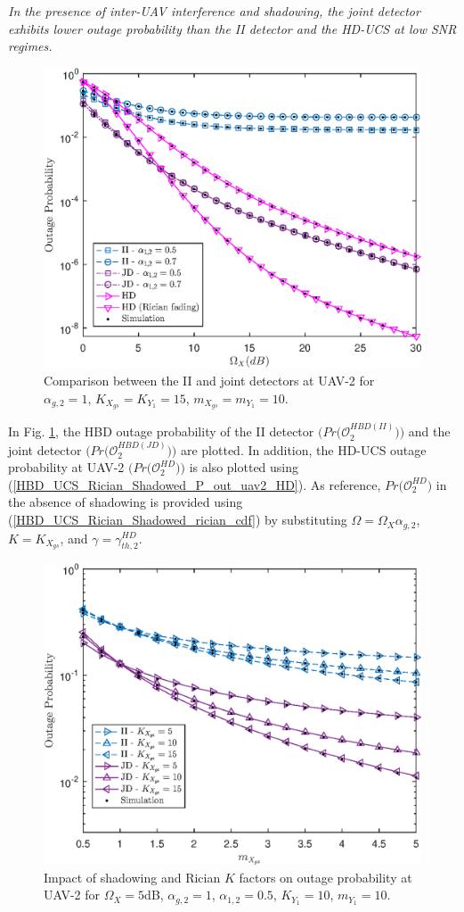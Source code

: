 \begin{observation}
\emph{\emph{In the presence of inter-UAV interference and shadowing, the joint detector exhibits lower outage probability than the II detector and the HD-UCS at low SNR regimes.}
}\end{observation}

\begin{figure} [t]
\centering
\vspace{0.2cm}
\includegraphics [width=0.45\columnwidth]{chap5_fig/uav2_II_vs_JD_outage.eps} 
\caption{Comparison between the II and joint detectors at UAV-2 for $\alpha_{g,2}=1$, $K_{X_{gs}}=K_{Y_1}=15$, $m_{X_{gs}}=m_{Y_1}=10$.}
\label{fig:HBD_UCS_Rician_Shadowed_uav2_II_vs_JD_outage}
\end{figure}

In Fig. \ref{fig:HBD_UCS_Rician_Shadowed_uav2_II_vs_JD_outage}, the HBD outage probability of the II detector $\big(Pr\big(\mathcal{O}_{2}^{HBD(II)}\big)\big)$ and the joint detector $\big(Pr\big(\mathcal{O}_{2}^{HBD(JD)}\big)\big)$ are plotted. In addition, the HD-UCS outage probability at UAV-2 $\big(Pr\big(\mathcal{O}_{2}^{HD}\big)\big)$ is also plotted using (\ref{HBD_UCS_Rician_Shadowed_P_out_uav2_HD}). As reference, $Pr\big(\mathcal{O}_{2}^{HD}\big)$ in the absence of shadowing is provided using (\ref{HBD_UCS_Rician_Shadowed_rician_cdf}) by substituting $\Omega = \Omega_X\alpha_{g,2}$, $K=K_{X_{gs}}$, and $\gamma=\gamma_{th,2}^{HD}$.

\begin{figure} [t]
\centering
\vspace{0.2cm}
\includegraphics [width=0.45\columnwidth]{chap5_fig/uav2_outage_mxgs_vs_my1.eps} 
\caption{Impact of shadowing and Rician $K$ factors on outage probability at UAV-2 for $\Omega_X = 5$dB, $\alpha_{g,2}=1$, $\alpha_{1,2}=0.5$, $K_{Y_1}=10$, $m_{Y_1}=10$.}
\label{fig:HBD_UCS_Rician_Shadowed_uav2_outage_mxgs_vs_my1}
\end{figure}

